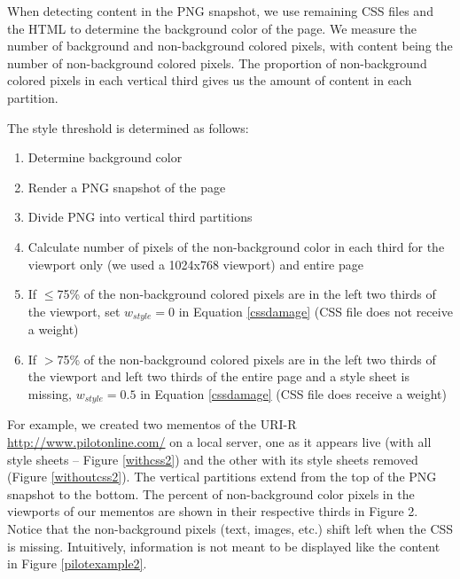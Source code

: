 When detecting content in the PNG snapshot, we use remaining CSS files and the HTML to determine the background color of the page. We measure the number of background and non-background colored pixels, with content being the number of non-background colored pixels. The proportion of non-background colored pixels in each vertical third gives us the amount of content in each partition.

The style threshold is determined as follows:

\begin{enumerate}
  \item Determine background color
  \item Render a PNG snapshot of the page
  \item Divide PNG into vertical third partitions
  \item Calculate number of pixels of the non-background color in each third for the viewport only (we used a 1024x768 viewport) and entire page
  \item If $\le$75\% of the non-background colored pixels are in the left two thirds of the viewport, set \emph{$w_{style}=0$} in Equation \ref{cssdamage} (CSS file does not receive a weight)
  \item If $>$75\% of the non-background colored pixels are in the left two thirds of the viewport and left two thirds of the entire page and a style sheet is missing, \emph{$w_{style}=0.5$} in Equation \ref{cssdamage} (CSS file does receive a weight)
\end{enumerate}

For example, we created two mementos of the URI-R \url{http://www.pilotonline.com/} on a local server, one as it appears live (with all style sheets -- Figure \ref{withcss2}) and the other with its style sheets removed (Figure \ref{withoutcss2}). The vertical partitions extend from the top of the PNG snapshot to the bottom.
 The percent of non-background color pixels in the viewports of our mementos are shown in their respective thirds in Figure 2. Notice that the non-background pixels (text, images, etc.) shift left when the CSS is missing. Intuitively, information is not meant to be displayed like the content in Figure \ref{pilotexample2}.

